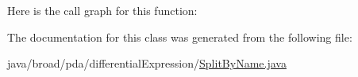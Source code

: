 Here is the call graph for this function\+:




The documentation for this class was generated from the following file\+:\begin{DoxyCompactItemize}
\item 
java/broad/pda/differential\+Expression/\hyperlink{_split_by_name_8java}{Split\+By\+Name.\+java}\end{DoxyCompactItemize}
